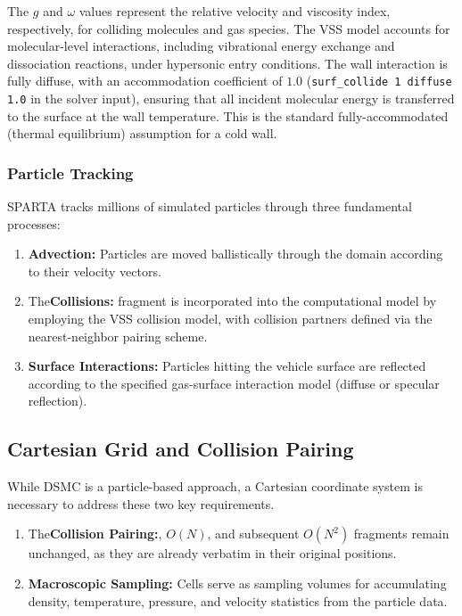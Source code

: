 The $g$ and $\omega$ values represent the relative velocity and viscosity index, respectively, for colliding molecules and gas species. The VSS model accounts for molecular-level interactions, including vibrational energy exchange and dissociation reactions, under hypersonic entry conditions. The wall interaction is fully diffuse, with an accommodation coefficient of $1.0$ (\texttt{surf\_collide 1 diffuse 1.0} in the solver input), ensuring that all incident molecular energy is transferred to the surface at the wall temperature. This is the standard fully-accommodated (thermal equilibrium) assumption for a cold wall.

\subsubsection*{Particle Tracking}
SPARTA tracks millions of simulated particles through three fundamental processes:
\begin{enumerate}
    \item \textbf{Advection:} Particles are moved ballistically through the domain according to their velocity vectors.

    \item The\textbf{Collisions:} fragment is incorporated into the computational model by employing the VSS collision model, with collision partners defined via the nearest-neighbor pairing scheme.

    \item \textbf{Surface Interactions:} Particles hitting the vehicle surface are reflected according to the specified gas-surface interaction model (diffuse or specular reflection).
\end{enumerate}

\subsection{Cartesian Grid and Collision Pairing}
While DSMC is a particle-based approach, a Cartesian coordinate system is necessary to address these two key requirements.
\begin{enumerate}
    \item The\textbf{Collision Pairing:}, $O(N)$, and subsequent $O(N^2)$ fragments remain unchanged, as they are already verbatim in their original positions.

    \item \textbf{Macroscopic Sampling:} Cells serve as sampling volumes for accumulating density, temperature, pressure, and velocity statistics from the particle data.
\end{enumerate}

